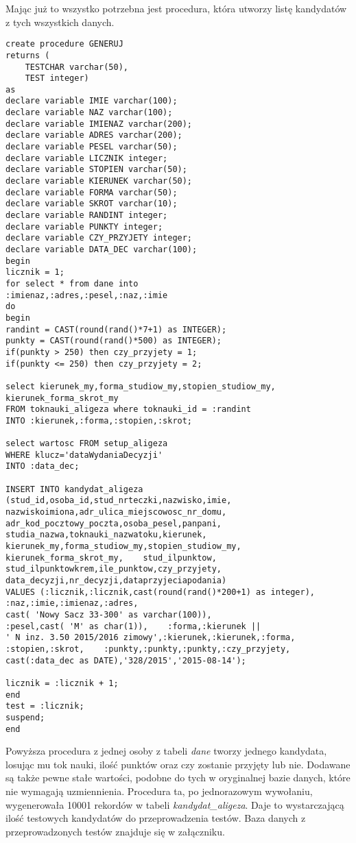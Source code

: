 Mając już to wszystko potrzebna jest procedura, która utworzy listę kandydatów z tych wszystkich danych. 

\begin{lstlisting}
create procedure GENERUJ
returns (
    TESTCHAR varchar(50),
    TEST integer)
as
declare variable IMIE varchar(100);
declare variable NAZ varchar(100);
declare variable IMIENAZ varchar(200);
declare variable ADRES varchar(200);
declare variable PESEL varchar(50);
declare variable LICZNIK integer;
declare variable STOPIEN varchar(50);
declare variable KIERUNEK varchar(50);
declare variable FORMA varchar(50);
declare variable SKROT varchar(10);
declare variable RANDINT integer;
declare variable PUNKTY integer;
declare variable CZY_PRZYJETY integer;
declare variable DATA_DEC varchar(100);
begin
licznik = 1;
for select * from dane into
:imienaz,:adres,:pesel,:naz,:imie
do
begin
randint = CAST(round(rand()*7+1) as INTEGER);
punkty = CAST(round(rand()*500) as INTEGER);
if(punkty > 250) then czy_przyjety = 1;
if(punkty <= 250) then czy_przyjety = 2;

select kierunek_my,forma_studiow_my,stopien_studiow_my,
kierunek_forma_skrot_my
FROM toknauki_aligeza where toknauki_id = :randint
INTO :kierunek,:forma,:stopien,:skrot;

select wartosc FROM setup_aligeza 
WHERE klucz='dataWydaniaDecyzji'
INTO :data_dec;

INSERT INTO kandydat_aligeza
(stud_id,osoba_id,stud_nrteczki,nazwisko,imie,
nazwiskoimiona,adr_ulica_miejscowosc_nr_domu,
adr_kod_pocztowy_poczta,osoba_pesel,panpani,
studia_nazwa,toknauki_nazwatoku,kierunek,
kierunek_my,forma_studiow_my,stopien_studiow_my,
kierunek_forma_skrot_my,    stud_ilpunktow,
stud_ilpunktowkrem,ile_punktow,czy_przyjety,
data_decyzji,nr_decyzji,dataprzyjeciapodania)
VALUES (:licznik,:licznik,cast(round(rand()*200+1) as integer),
:naz,:imie,:imienaz,:adres, 
cast( 'Nowy Sacz 33-300' as varchar(100)),
:pesel,cast( 'M' as char(1)),    :forma,:kierunek || 
' N inz. 3.50 2015/2016 zimowy',:kierunek,:kierunek,:forma,
:stopien,:skrot,    :punkty,:punkty,:punkty,:czy_przyjety,
cast(:data_dec as DATE),'328/2015','2015-08-14');

licznik = :licznik + 1;
end
test = :licznik;
suspend;
end
\end{lstlisting}
Powyższa procedura z jednej osoby z tabeli \emph{dane} tworzy jednego kandydata, losując mu tok nauki, ilość punktów oraz czy zostanie przyjęty lub nie. Dodawane są także pewne stałe wartości, podobne do tych w oryginalnej bazie danych, które nie wymagają uzmiennienia. Procedura ta, po jednorazowym wywołaniu, wygenerowała 10001 rekordów w tabeli \emph{kandydat\_aligeza}. Daje to wystarczającą ilość testowych kandydatów do przeprowadzenia testów. Baza danych z przeprowadzonych testów znajduje się w załączniku.

